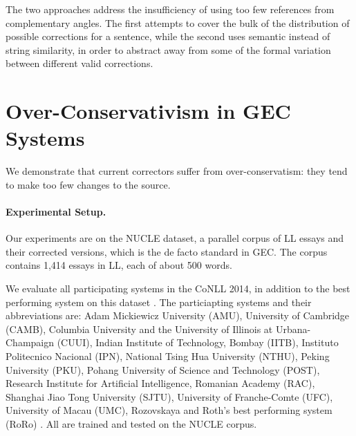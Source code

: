 \documentclass[letter,11pt]{article}
\begin{document}
The two approaches address the insufficiency of using too few references from
complementary angles. 
The first attempts to cover the bulk of the distribution of possible
corrections for a sentence, while the second
uses semantic instead of string similarity, in order to abstract away
from some of the formal variation between different valid corrections.

\section{Over-Conservativism in GEC Systems}\label{sec:formal_conservatism}



We demonstrate that current correctors
suffer from over-conservatism: they tend to make too few changes to the source. 


\paragraph{Experimental Setup.}\label{par:experimental_setup}

Our experiments are on the NUCLE dataset,
a parallel corpus of LL essays and their corrected versions,
which is the de facto standard in GEC.
The corpus contains 1,414 essays in LL, each of about 500 words.

We evaluate all participating systems in the CoNLL 2014,
in addition to the best performing system on this dataset \cite{rozovskaya2014building}.
The particiapting systems and their abbreviations are: Adam Mickiewicz University (AMU),
University of Cambridge (CAMB), Columbia University and the University of Illinois at Urbana-Champaign (CUUI),
Indian Institute of Technology, Bombay (IITB), Instituto Politecnico Nacional (IPN),
National Tsing Hua University (NTHU), Peking University (PKU), Pohang University of Science and Technology (POST),
Research Institute for Artificial Intelligence, Romanian Academy (RAC), Shanghai Jiao Tong University (SJTU),
University of Franche-Comte (UFC), University of Macau (UMC),
Rozovskaya and Roth's best performing system (RoRo) \cite{rozovskaya2016grammatical}.
All are trained and tested on the NUCLE corpus.
\end{document}
